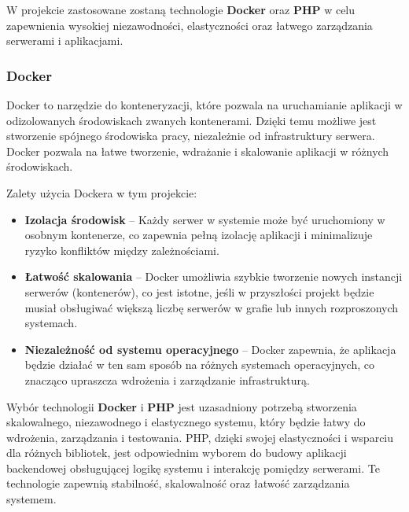 W projekcie zastosowane zostaną technologie \textbf{Docker} oraz \textbf{PHP} w celu zapewnienia wysokiej niezawodności, elastyczności oraz łatwego zarządzania serwerami i aplikacjami.

\subsubsection{Docker}

Docker to narzędzie do konteneryzacji, które pozwala na uruchamianie aplikacji w odizolowanych środowiskach zwanych kontenerami. Dzięki temu możliwe jest stworzenie spójnego środowiska pracy, niezależnie od infrastruktury serwera. Docker pozwala na łatwe tworzenie, wdrażanie i skalowanie aplikacji w różnych środowiskach.

Zalety użycia Dockera w tym projekcie:
\begin{itemize}
	\item \textbf{Izolacja środowisk} – Każdy serwer w systemie może być uruchomiony w osobnym kontenerze, co zapewnia pełną izolację aplikacji i minimalizuje ryzyko konfliktów między zależnościami.
	\item \textbf{Łatwość skalowania} – Docker umożliwia szybkie tworzenie nowych instancji serwerów (kontenerów), co jest istotne, jeśli w przyszłości projekt będzie musiał obsługiwać większą liczbę serwerów w grafie lub innych rozproszonych systemach.
	\item \textbf{Niezależność od systemu operacyjnego} – Docker zapewnia, że aplikacja będzie działać w ten sam sposób na różnych systemach operacyjnych, co znacząco upraszcza wdrożenia i zarządzanie infrastrukturą.
\end{itemize}


Wybór technologii \textbf{Docker} i \textbf{PHP} jest uzasadniony potrzebą stworzenia skalowalnego, niezawodnego i elastycznego systemu, który będzie łatwy do wdrożenia, zarządzania i testowania. PHP, dzięki swojej elastyczności i wsparciu dla różnych bibliotek, jest odpowiednim wyborem do budowy aplikacji backendowej obsługującej logikę systemu i interakcję pomiędzy serwerami. Te technologie zapewnią stabilność, skalowalność oraz łatwość zarządzania systemem.
